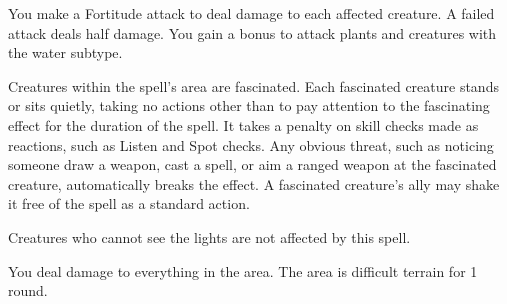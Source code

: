 \spellrng{\rngfar}
\begin{spelleffect}
    You make a Fortitude attack to deal damage to each affected creature. A failed attack deals half damage. You gain a  bonus to attack plants and creatures with the water subtype. 
\end{spelleffect}

\spellrng{\rngmed}
\spelldur{\durshort}
\begin{spelleffect}
    Creatures within the spell's area are fascinated. Each fascinated creature stands or sits quietly, taking no actions other than to pay attention to the fascinating effect for the duration of the spell. It takes a  penalty on skill checks made as reactions, such as Listen and Spot checks. Any obvious threat, such as noticing someone draw a weapon, cast a spell, or aim a ranged weapon at the fascinated creature, automatically breaks the effect. A fascinated creature's ally may shake it free of the spell as a standard action.
\end{spelleffect}
\begin{spellnotes}
  Creatures who cannot see the lights are not affected by this spell.
\end{spellnotes}

\begin{comment}
\subsubsection{I}
\end{comment}

\spellrng{\rngmed}
\begin{spelleffect}
    You deal damage to everything in the area. The area is difficult terrain for 1 round.
\end{spelleffect}

